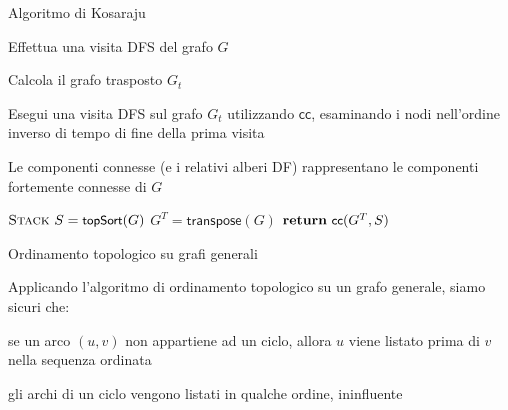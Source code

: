 \begin{frame}{Algoritmo di Kosaraju}

\vspace{-9pt}
\begin{myboxtitle}
\BI
\item Effettua una visita DFS del grafo $G$
\item Calcola il grafo trasposto $G_t$
\item Esegui una visita DFS sul grafo $G_t$ utilizzando $\textsf{cc}$, esaminando i nodi nell'ordine inverso di tempo di fine della prima visita
\item Le componenti connesse (e i relativi alberi DF) rappresentano le componenti fortemente connesse di $G$
\EI
\end{myboxtitle}

\begin{Procedure}
\caption[A]{$\INTEGER[\,]$ \scc($\Graph\ G$)}

  $\textsc{Stack}\ S = \textsf{{\small topSort}}(G)$
  $G^T = \textsf{transpose}(G)$
  $\Return\ \connectedcomponents(G^T, S)$

\end{Procedure}
\end{frame}

\begin{frame}{Ordinamento topologico su grafi generali}

\vspace{-6pt}
\begin{myboxtitle}
Applicando l'algoritmo di ordinamento topologico su un grafo generale, siamo
sicuri che:
\BIL
\item se un arco $(u,v)$ non appartiene ad un ciclo, allora $u$ viene listato
prima di $v$ nella sequenza ordinata
\item gli archi di un ciclo vengono listati in qualche ordine, ininfluente
\EIL
\end{myboxtitle}



\end{frame}

